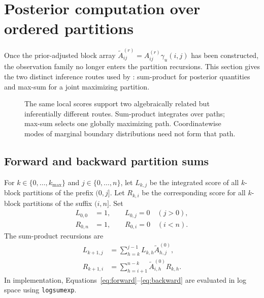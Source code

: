 \section{Posterior computation over ordered partitions}
\label{sec:exact-inference}

Once the prior-adjusted block array
$\widetilde A^{(r)}_{ij}=A^{(r)}_{ij}\gamma_u(i,j)$ has been constructed, the observation family no longer enters the partition recursions. This section gives the two distinct inference routes used by \BayesBreak: sum-product for posterior quantities and max-sum for a joint maximizing partition.

\begin{figure}[!htbp]
  \centering
  \resizebox{0.91\textwidth}{!}{}
  \caption{The same local scores support two algebraically related but inferentially different routes. Sum-product integrates over paths; max-sum selects one globally maximizing path. Coordinatewise modes of marginal boundary distributions need not form that path.}
  \label{fig:semiring-routes}
\end{figure}

\subsection{Forward and backward partition sums}
For $k\in\{0,\ldots,k_{\max}\}$ and $j\in\{0,\ldots,n\}$, let $L_{k,j}$ be the integrated score of all $k$-block partitions of the prefix $(0,j]$. Let $R_{k,i}$ be the corresponding score for all $k$-block partitions of the suffix $(i,n]$. Set
\begin{align*}
L_{0,0}&=1,\qquad L_{0,j}=0\quad(j>0),\\
R_{0,n}&=1,\qquad R_{0,i}=0\quad(i<n).
\end{align*}
The sum-product recursions are
\begin{align}
L_{k+1,j}&=\sum_{h=k}^{j-1}L_{k,h}\widetilde A^{(0)}_{h,j},
\label{eq:forward}\\
R_{k+1,i}&=\sum_{h=i+1}^{n-k}\widetilde A^{(0)}_{i,h}R_{k,h}.
\label{eq:backward}
\end{align}
In implementation, Equations~\eqref{eq:forward}--\eqref{eq:backward} are evaluated in log space using \texttt{logsumexp}.

